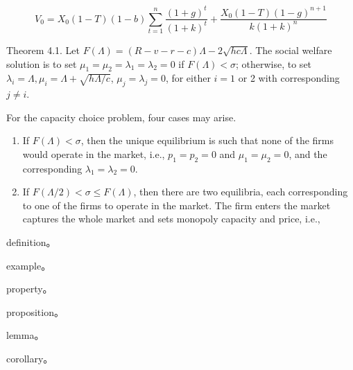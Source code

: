 \documentclass[writingLanguage=english, %
    addPageTitle=on,  %
    addDeclaration=on, %
    addMUSTlog=off, %
    addFigTOC=on, %
    addTabTOC=on, %
    refIndent=off, %
    printMod=off, %
]{must}
\begin{document}
\begin{equation}
V_0=X_0(1-T)(1-b) \sum_{t=1}^n \frac{(1+g)^t}{(1+k)^t}+\frac{X_0(1-T)(1-g)^{n+1}}{k(1+k)^n}
\end{equation}


\begin{axiom}
Theorem 4.1. Let $F(\Lambda)=(R-v-r-c) \Lambda-2 \sqrt{h c \Lambda}$. The social welfare solution is to set $\mu_1=\mu_2=\lambda_1=\lambda_2=0$ if $F(\Lambda)<\sigma$; otherwise, to set $\lambda_i=\Lambda, \mu_i=\Lambda+\sqrt{h \Lambda / c}$, $\mu_j=\lambda_j=0$, for either $i=1$ or 2 with corresponding $j \neq i$.
\end{axiom}


\begin{theorem}
For the capacity choice problem, four
cases may arise.
\begin{enumerate}[itemsep=2pt,topsep=0pt,parsep=0pt,leftmargin=*,label=\emph{(\roman*)}]
    \item If $F(\Lambda)<\sigma$, then the unique equilibrium is such that none of the firms would operate in the market, i.e., $p_1=p_2=0$ and $\mu_1=\mu_2=0$, and the corresponding $\lambda_1=\lambda_2=0$.
    \item If $F(\Lambda / 2)<\sigma \leqslant F(\Lambda)$, then there are two equilibria, each corresponding to one of the firms to operate in the market. The firm enters the market captures the whole market and sets monopoly capacity and price, i.e.,
\end{enumerate}

\end{theorem}


\begin{definition}
 definition。
\end{definition}


\begin{example}
 example。
\end{example}



\begin{property}
 property。
\end{property}

\begin{proposition}
 proposition。
\end{proposition}


\begin{lemma}
 lemma。
\end{lemma}

\begin{corollary}
 corollary。
\end{corollary}
\end{document}
